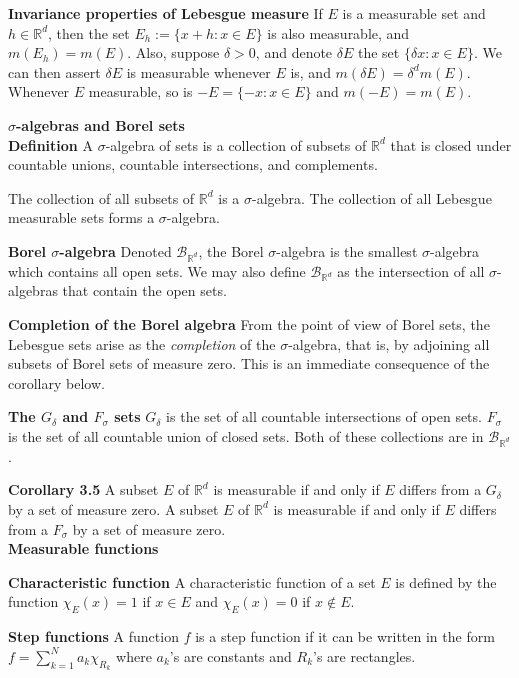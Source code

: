 \documentclass[6pt,landscape]{article}
\begin{document}
\begin{multicols*}{3}
\textbf{Invariance properties of Lebesgue measure} If $E$ is a measurable set and $h\in\mathbb{R}^d$, then the set $E_h := \{x+h: x\in E\}$ is also measurable, and $m(E_h) = m(E)$.
Also, suppose $\delta>0$, and denote $\delta E$ the set $\{\delta x: x\in E\}$. We can then assert $\delta E$ is measurable whenever $E$ is, and $m(\delta E) = \delta^d m(E)$. Whenever
$E$ measurable, so is $-E = \{-x: x\in E\}$ and $m(-E) = m(E)$. 

\textbf{$\sigma$-algebras and Borel sets}\\

\textbf{Definition} A $\sigma$-algebra of sets is a collection of subsets of $\mathbb{R}^d$ that is closed under countable unions, countable intersections, and complements.

The collection of all subsets of $\mathbb{R}^d$ is a $\sigma$-algebra. The collection of all Lebesgue measurable sets forms a $\sigma$-algebra.

\textbf{Borel $\sigma$-algebra} Denoted $\mathcal{B}_{\mathbb{R}^d}$, the Borel $\sigma$-algebra is the smallest $\sigma$-algebra which contains all open sets. We may also define
$\mathcal{B}_{\mathbb{R}^d}$ as the intersection of all $\sigma$-algebras that contain the open sets.

\textbf{Completion of the Borel algebra} From the point of view of Borel sets, the Lebesgue sets arise as the \textit{completion} of the $\sigma$-algebra, that is, by adjoining all subsets of Borel sets of measure zero. This is an
immediate consequence of the corollary below.

\textbf{The $G_{\delta}$ and $F_{\sigma}$ sets} $G_{\delta}$ is the set of all countable intersections of open sets. $F_{\sigma}$ is the set of all countable union of closed sets. Both of these
collections are in $\mathcal{B}_{\mathbb{R}^d}$.

\textbf{Corollary 3.5} A subset $E$ of $\mathbb{R}^d$ is measurable if and only if $E$ differs from a $G_{\delta}$ by a set of measure zero. A subset $E$ of $\mathbb{R}^d$ is measurable
if and only if $E$ differs from a $F_{\sigma}$ by a set of measure zero.\\

\textbf{Measurable functions}

\textbf{Characteristic function} A characteristic function of a set $E$ is defined by the function $\chi_E(x) = 1$ if $x\in E$ and $\chi_E(x) = 0$ if $x\not\in E$.

\textbf{Step functions} A function $f$ is a step function if it can be written in the form $f = \sum_{k=1}^N a_k\chi_{R_k}$ where $a_k$'s are constants and $R_k$'s are rectangles.


\end{multicols*}
\end{document}
